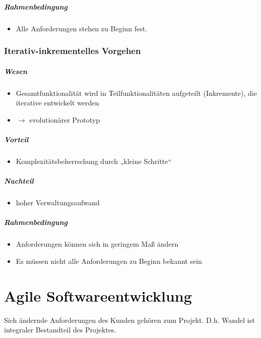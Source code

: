 \documentclass{scrreprt}
\begin{document}
\paragraph{Rahmenbedingung}
\begin{itemize}
\item Alle Anforderungen stehen zu Beginn fest.
\end{itemize}

\subsection{Iterativ-inkrementelles Vorgehen}
\paragraph{Wesen} 
\begin{itemize}
\item Gesamtfunktionalität wird in Teilfunktionalitäten aufgeteilt (Inkremente), die iterative entwickelt werden
\item[]$\to$ evolutionärer Prototyp
\end{itemize}

\paragraph{Vorteil}
\begin{itemize}
\item Komplexitätsbeherrschung durch „kleine Schritte“
\end{itemize}

\paragraph{Nachteil}
\begin{itemize}
\item hoher Verwaltungsaufwand
\end{itemize}

\paragraph{Rahmenbedingung}
\begin{itemize}
\item Anforderungen können sich in geringem Maß ändern
\item Es müssen nicht alle Anforderungen zu Beginn bekannt sein
\end{itemize}

\chapter{Agile Softwareentwicklung}
Sich ändernde Anforderungen des Kunden gehören zum Projekt. D.h. Wandel ist integraler Bestandteil des Projektes.
\end{document}
